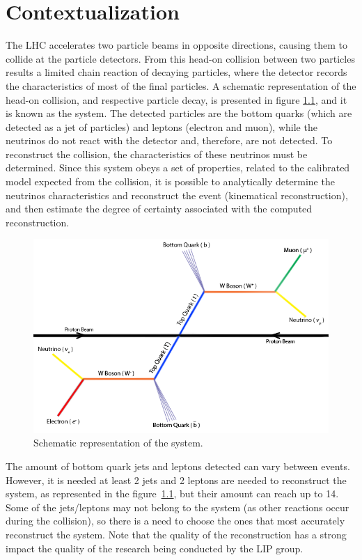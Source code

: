 
\chapter{Contextualization}
\label{context}

The LHC accelerates two particle beams in opposite directions, causing them to collide at the particle detectors. From this head-on collision between two particles results a limited chain reaction of decaying particles, where the detector records the characteristics of most of the final particles. A schematic representation of the head-on collision, and respective particle decay, is presented in figure \ref{fig:ttbar}, and it is known as the \ttbar system. The detected particles are the bottom quarks (which are detected as a jet of particles) and leptons (electron and muon), while the neutrinos do not react with the detector and, therefore, are not detected. To reconstruct the collision, the characteristics of these neutrinos must be determined. Since this system obeys a set of properties, related to the calibrated model expected from the collision, it is possible to analytically determine the neutrinos characteristics and reconstruct the event (kinematical reconstruction), and then estimate the degree of certainty associated with the computed reconstruction.

\begin{figure}[!htp]
	\begin{center}
		\includegraphics[scale=0.5]{../../common/img/ttbar.png}
		\caption{Schematic representation of the \ttbar system.}
		\label{fig:ttbar}
	\end{center}
\end{figure}

The amount of bottom quark jets and leptons detected can vary between events. However, it is needed at least 2 jets and 2 leptons are needed to reconstruct the \ttbar system, as represented in the figure~\ref{fig:ttbar}, but their amount can reach up to 14. Some of the jets/leptons may not belong to the \ttbar system (as other reactions occur during the collision), so there is a need to choose the ones that most accurately reconstruct the system. Note that the quality of the reconstruction has a strong impact the quality of the research being conducted by the LIP group.

